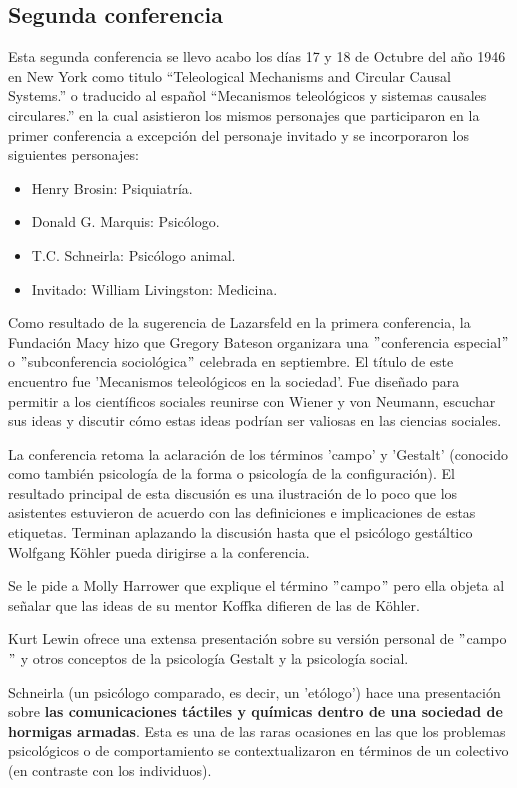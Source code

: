 \documentclass[11pt]{article}
\begin{document}
		\subsection{Segunda conferencia}
		Esta segunda conferencia se llevo acabo los días 17 y 18 de Octubre del año 1946 en New York como titulo ``Teleological Mechanisms and Circular Causal Systems.'' o traducido al español ``Mecanismos teleológicos y sistemas causales circulares.'' en la cual asistieron los mismos personajes que participaron en la primer conferencia a excepción del personaje invitado y se incorporaron los siguientes personajes:
		\begin{itemize}
    		\item Henry Brosin: Psiquiatría.
    		\item Donald G. Marquis: Psicólogo.
    		\item T.C. Schneirla: Psicólogo animal.
			\item Invitado: William Livingston: Medicina.
		\end{itemize}
 		Como resultado de la sugerencia de Lazarsfeld en la primera conferencia, la Fundación Macy hizo que Gregory Bateson organizara una $"$conferencia especial$"$ o $"$subconferencia sociológica$"$  celebrada en septiembre. El título de este encuentro fue 'Mecanismos teleológicos en la sociedad'. Fue diseñado para permitir a los científicos sociales reunirse con Wiener y von Neumann, escuchar sus ideas y discutir cómo estas ideas podrían ser valiosas en las ciencias sociales.\par
		La conferencia retoma la aclaración de los términos 'campo' y 'Gestalt' (conocido como también psicología de la forma o psicología de la configuración). El resultado principal de esta discusión es una ilustración de lo poco que los asistentes estuvieron de acuerdo con las definiciones e implicaciones de estas etiquetas. Terminan aplazando la discusión hasta que el psicólogo gestáltico Wolfgang Köhler pueda dirigirse a la conferencia.\par
		Se le pide a Molly Harrower que explique el término $"$campo$"$ pero ella objeta al señalar que las ideas de su mentor Koffka difieren de las de Köhler.\par
 		Kurt Lewin ofrece una extensa presentación sobre su versión personal de $"$campo$"$ y otros conceptos de la psicología Gestalt y la psicología social.\par
 		Schneirla (un psicólogo comparado, es decir, un 'etólogo') hace una presentación sobre\textbf{ las comunicaciones táctiles y químicas dentro de una sociedad de hormigas armadas}. Esta es una de las raras ocasiones en las que los problemas psicológicos o de comportamiento se contextualizaron en términos de un colectivo (en contraste con los individuos).\par
\end{document}
